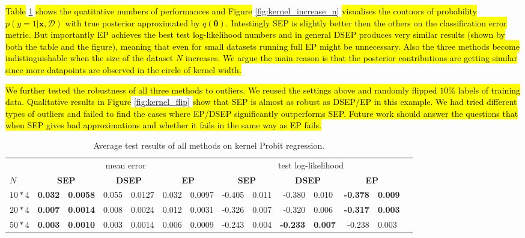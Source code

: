 \documentclass{article} %
\newcommand{\ica}{\hspace{0.25cm}}
\begin{document}
\hl{Table} \ref{tab:kernel} \hl{shows the quatitative numbers of performances and Figure} \ref{fig:kernel_increase_n} \hl{visualises the contuors of probability $p(y = 1|\bm{x}, \mathcal{D})$ with true posterior approximated by $q(\bm{\theta})$. Intestingly SEP is slightly better then the others on the classification error metric. But importantly EP achieves the best test log-likelihood numbers and in general DSEP produces very similar results (shown by both the table and the figure), meaning that even for small datasets running full EP might be unnecessary. Also the three methods become indistinguishable when the size of the dataset $N$ increases. We argue the main reason is that the posterior contributions are getting similar since more datapoints are observed in the circle of kernel width.}

\hl{We further tested the robustness of all three methods to outliers. We reused the settings above and randomly flipped $10\%$ labels of training data. Qualitative results in Figure} \ref{fig:kernel_flip} \hl{show that SEP is almost as robust as DSEP/EP in this example. We had tried different types of outliers and failed to find the cases where EP/DSEP significantly outperforms SEP. Future work should answer the questions that when SEP gives bad approximations and whether it fails in the same way as EP fails.}


\begin{table} 
\small
\centering
 \caption{ Average test results of all methods on kernel Probit regression.}
  \label{tab:kernel} 
\begin{tabular}{l@{\ica}r@{$\pm$}l@{\ica}r@{$\pm$}l@{\ica}r@{$\pm$}l@{\ica}r@{$\pm$}l@{\ica}r@{$\pm$}
	l@{\ica}r@{$\pm$}l@{\ica}r@{$\pm$}}\hline 
{} & \multicolumn{6}{c}{mean error} & \multicolumn{6}{c}{test log-likelihood} \\
\bf{$N$}&\multicolumn{2}{c}{\bf{ SEP }}&\multicolumn{2}{c}{\bf{ DSEP }}&\multicolumn{2}{c}{\bf{ EP }} &\multicolumn{2}{c}{\bf{ SEP }}&\multicolumn{2}{c}{\bf{ DSEP }}&\multicolumn{2}{c}{\bf{ EP }} \\ \hline 
%
$10*4$&\bf{0.032}&\bf{0.0058}&0.055&0.0127&0.032&0.0097 
	&-0.405&0.011&-0.380&0.010&\bf{-0.378}&\bf{0.009} \\
%
$20*4$&\bf{0.007}&\bf{0.0014}&0.008&0.0024&0.012&0.0031 
	&-0.326&0.007&-0.320&0.006&\bf{-0.317}&\bf{0.003} \\
%
$50*4$&\bf{0.003}&\bf{0.0010}&0.003&0.0014&0.006&0.0009 
	&-0.243&0.004&\bf{-0.233}&\bf{0.007}&-0.238&0.003 \\
%
 \hline \end{tabular} 
 \end{table} 
\end{document}
